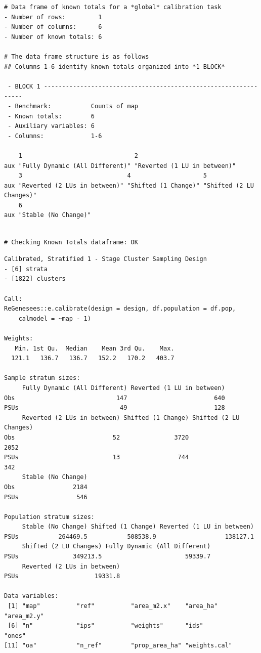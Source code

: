 \documentclass[twoside]{extreport}
\begin{document}
\begin{verbatim}
# Data frame of known totals for a *global* calibration task
- Number of rows:         1
- Number of columns:      6
- Number of known totals: 6

# The data frame structure is as follows
## Columns 1-6 identify known totals organized into *1 BLOCK* 

 - BLOCK 1 ---------------------------------------------------------------- 
 - Benchmark:           Counts of map 
 - Known totals:        6 
 - Auxiliary variables: 6 
 - Columns:             1-6 

    1                               2                           
aux "Fully Dynamic (All Different)" "Reverted (1 LU in between)"
    3                             4                    5                       
aux "Reverted (2 LUs in between)" "Shifted (1 Change)" "Shifted (2 LU Changes)"
    6                   
aux "Stable (No Change)"
\end{verbatim}

\begin{verbatim}

# Checking Known Totals dataframe: OK
\end{verbatim}

\begin{verbatim}
Calibrated, Stratified 1 - Stage Cluster Sampling Design
- [6] strata
- [1822] clusters

Call:
ReGenesees::e.calibrate(design = design, df.population = df.pop, 
    calmodel = ~map - 1)

Weights:
   Min. 1st Qu.  Median    Mean 3rd Qu.    Max. 
  121.1   136.7   136.7   152.2   170.2   403.7 

Sample stratum sizes: 
     Fully Dynamic (All Different) Reverted (1 LU in between)
Obs                            147                        640
PSUs                            49                        128
     Reverted (2 LUs in between) Shifted (1 Change) Shifted (2 LU Changes)
Obs                           52               3720                   2052
PSUs                          13                744                    342
     Stable (No Change)
Obs                2184
PSUs                546

Population stratum sizes: 
     Stable (No Change) Shifted (1 Change) Reverted (1 LU in between)
PSUs           264469.5           508538.9                   138127.1
     Shifted (2 LU Changes) Fully Dynamic (All Different)
PSUs               349213.5                       59339.7
     Reverted (2 LUs in between)
PSUs                     19331.8

Data variables:
 [1] "map"          "ref"          "area_m2.x"    "area_ha"      "area_m2.y"   
 [6] "n"            "ips"          "weights"      "ids"          "ones"        
[11] "oa"           "n_ref"        "prop_area_ha" "weights.cal" 
\end{verbatim}
\end{document}
